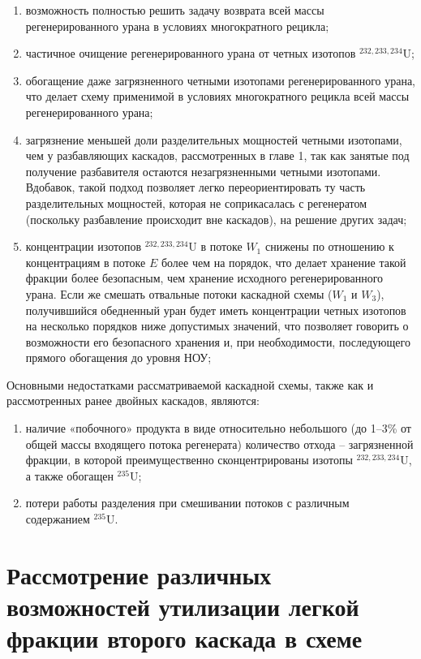 \begin{enumerate}
    \item возможность полностью решить задачу возврата всей массы регенерированного урана в условиях многократного рецикла;
    \item частичное очищение регенерированного урана от четных изотопов $^{232,233,234}$U;
    \item обогащение даже загрязненного четными изотопами регенерированного урана, что делает схему применимой в условиях многократного рецикла всей массы регенерированного урана;
    \item загрязнение меньшей доли разделительных мощностей четными изотопами, чем у разбавляющих каскадов, рассмотренных в главе 1, так как занятые под получение разбавителя остаются незагрязненными четными изотопами. Вдобавок, такой подход позволяет легко переориентировать ту часть разделительных мощностей, которая не соприкасалась с регенератом (поскольку разбавление происходит вне каскадов), на решение других задач;
    \item концентрации изотопов $^{232,233,234}$U в потоке $W_1$ снижены по отношению к концентрациям в потоке $E$ более чем на порядок, что делает хранение такой фракции более безопасным, чем хранение исходного регенерированного урана. Если же смешать отвальные потоки каскадной схемы ($W_1$  и $W_3$), получившийся обедненный уран будет иметь концентрации четных изотопов на несколько порядков ниже допустимых значений, что позволяет говорить о возможности его безопасного хранения и, при необходимости, последующего прямого обогащения до уровня НОУ;
\end{enumerate}

Основными недостатками рассматриваемой каскадной схемы, также как и рассмотренных ранее двойных каскадов, являются: 
\begin{enumerate}
    \item наличие «побочного» продукта в виде относительно небольшого (до 1–3\% от общей массы входящего потока регенерата) количество отхода -- загрязненной фракции, в которой преимущественно сконцентрированы изотопы $^{232,233,234}$U, а также обогащен $^{235}$U;
    \item потери работы разделения при смешивании потоков с различным содержанием  $^{235}$U.
\end{enumerate}





\section{Рассмотрение различных возможностей утилизации легкой фракции второго каскада в схеме}

